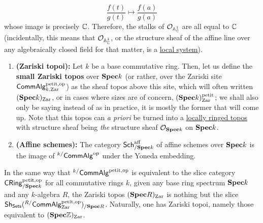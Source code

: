 \begin{example}
\begin{enumerate}
			                    $$\frac{f(t)}{g(t)} \mapsto \frac{f(a)}{g(a)}$$
		                    whose image is precisely $\mathbb{C}$. Therefore, the stalks of $\mathcal{O}_{\mathbb{A}^1_{\mathbb{C}}}$ are all equal to $\mathbb{C}$ (incidentally, this means that $\mathcal{O}_{\mathbb{A}^1_{\mathbb{C}}}$, or the structure sheaf of the affine line over any algebraically closed field for that matter, is a \href{https://en.wikipedia.org/wiki/Local_system}{\underline{local system}}).
				        \end{enumerate}
                \end{example}
                
                \begin{definition} \label{def: zariski_topoi} 
                    \noindent
                    \begin{enumerate}
                        \item \textbf{(Zariski topoi):} Let $k$ be a base commutative ring. Then, let us define the \textbf{small Zariski topos} over $\mathbf{Spec} k$ (or rather, over the Zariski site $\mathsf{Comm}\mathsf{Alg}^{\mathrm{petit}, \mathrm{op}}_{k, \mathrm{Zar}}$) as the sheaf topos above this site, which will often written $(\mathbf{Spec} k)_{\mathrm{Zar}}$, or in cases where sizes are of concern, $(\mathbf{Spec} k)_{\mathrm{Zar}}^{\mathrm{petit}}$; we shall also only be saying  instead of  as in practice, it is mostly the former that will come up. Note that this topos can \textit{a priori} be turned into a \href{https://ncatlab.org/nlab/show/locally+ringed+topos}{\underline{locally ringed topos}} with structure sheaf being \textit{the} structure sheaf $\mathcal{O}_{\mathbf{Spec} k}$ on $\mathbf{Spec} k$.
                        \item \textbf{(Affine schemes):} The category $\mathsf{Sch}^{\mathrm{aff}}_{/\mathbf{Spec} k}$ of affine schemes over $\mathbf{Spec} k$ is the image of ${}^{k/}\mathsf{Comm}\mathsf{Alg}^{\mathrm{op}}$ under the Yoneda embedding. 
                    \end{enumerate}
                \end{definition}
                
                \begin{remark}[On relativisation]
                    In the same way that ${}^{k/}\mathsf{Comm}\mathsf{Alg}^{\mathrm{petit}, \mathrm{op}}$ is equivalent to the slice category $\mathsf{CRing}^{\mathrm{petit}, \mathrm{op}}_{/\mathbf{Spec} k}$ for all commutative rings $k$, given any base ring spectrum $\mathbf{Spec} k$ and any $k$-algebra $R$, the Zariski topos $(\mathbf{Spec} R)_{\mathrm{Zar}}$ is nothing but the slice $\mathsf{Sh}_{\mathsf{Sets}}({}^{R/}\mathsf{Comm}\mathsf{Alg}_{\mathrm{Zar}}^{\mathrm{petit}, \mathrm{op}})_{/\mathbf{Spec} R}$. Naturally, one has  Zariski topoi, namely those equivalent to $(\mathbf{Spec} \mathbb{Z})_{\mathrm{Zar}}$.
                \end{remark}
                
